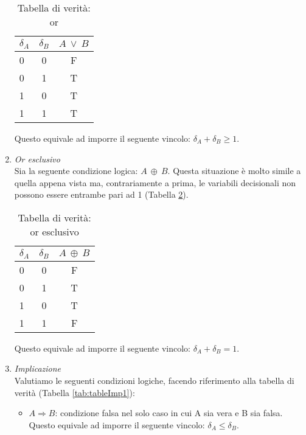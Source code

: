 \begin{enumerate}
\begin{table}[h!]
  \begin{center}
    \begin{tabular}{l|c|c} %
      $\delta_A$ & $\delta_B$ & $A~\vee~B$ \\
      \hline
      0 & 0 & F\\
      0 & 1 & T\\
      1 & 0 & T\\
      1 & 1 & T\\
    \end{tabular}
    \caption{Tabella di verità: or}
    \label{tab:tableOR}
  \end{center}
\end{table}

Questo equivale ad imporre il seguente vincolo: $\delta_A + \delta_B \geq 1$.
\\
\item \textit{Or esclusivo}\\
Sia la seguente condizione logica: $A~\oplus~B$.
Questa situazione è molto simile a quella appena vista ma, contrariamente a prima, le variabili decisionali non possono essere entrambe pari ad 1 (Tabella \ref{tab:tableORe}).

\begin{table}[h!]
  \begin{center}
    \begin{tabular}{l|c|c} %
      $\delta_A$ & $\delta_B$ & $A~\oplus~B$ \\
      \hline
      0 & 0 & F\\
      0 & 1 & T\\
      1 & 0 & T\\
      1 & 1 & F\\
    \end{tabular}
    \caption{Tabella di verità: or esclusivo}
    \label{tab:tableORe}
  \end{center}
\end{table}

Questo equivale ad imporre il seguente vincolo: $\delta_A + \delta_B = 1$.

\item \textit{Implicazione}\\
Valutiamo le seguenti condizioni logiche, facendo riferimento alla tabella di verità (Tabella \ref{tab:tableImp1}): 
\begin{itemize}
\item $A\Longrightarrow B$: condizione falsa nel solo caso in cui A sia vera e B sia falsa.
Questo equivale ad imporre il seguente vincolo: $\delta_A \leq \delta_B$.


\end{itemize}
\end{enumerate}
